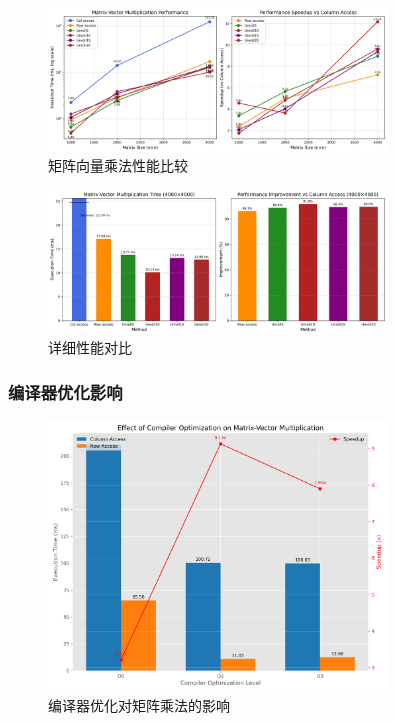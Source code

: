 \documentclass[a4paper,colorlinks=true,linkcolor=blue,urlcolor=blue,citecolor=green,bookmarks=true]{article}
\begin{document}
\begin{figure}[htbp]
  \centering
  \includegraphics[width=0.8\textwidth]{matrix_vector_performance.png}
  \caption{矩阵向量乘法性能比较}
  \label{fig:matrix_vector_performance}
\end{figure}

\begin{figure}[htbp]
  \centering
  \includegraphics[width=0.8\textwidth]{matrix_vector_detail_performance.png}
  \caption{详细性能对比}
  \label{fig:detail_performance}
\end{figure}

\subsubsection{编译器优化影响}

\begin{figure}[htbp]
  \centering
  \includegraphics[width=0.8\textwidth]{compiler_opt_matrix.png}
  \caption{编译器优化对矩阵乘法的影响}
  \label{fig:compiler_opt_matrix}
\end{figure}
\end{document}
